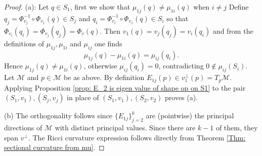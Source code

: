 \documentclass[12pt]{amsart}
\theoremstyle{plain}
\theoremstyle{definition}
\numberwithin{equation}{section}
\begin{document}
\begin{proof}
(a): Let $q\in S_1$, first we show that $\mu_{1j}(q)\neq \mu_{1i}(q)$ when $i\neq j$ Define $q_j=\Phi_{v_j}^{-1}\circ\Phi_{v_1}(q)\in S_{j}$ and $q_i=\Phi_{v_i}^{-1}\circ\Phi_{v_1}(q)\in S_i$ so that $\Phi_{v_i}(q_i)=\Phi_{v_j}(q_j)=\Phi_{v}(q)$. Then $v_1(q)=v_j(q_j)=v_i(q_i)$ and from the definitions of $\mu_{1j},\mu_{1i}$ and $\mu_{ij}$ one finds
\[
\mu_{1j}(q)-\mu_{1i}(q)=\mu_{ij}(q_i).
\]
Hence $\mu_{1j}(q)\neq\mu_{1i}(q)$, otherwise $\mu_{ij}(q_i)=0$, contradicting $0\notin\mu_{ij}(S_i)$. Let $\mathcal{M}$ and $p\in \mathcal{M}$ be as above. By definition $E_{1j}(p)\in v_1^\perp(p)=T_p\mathcal{M}$. Applying Proposition \ref{prop: E_2 is eigen value of shape op on S1} to the pair $(S_1,v_1),(S_j,v_j)$ in place of  $(S_1,v_1),(S_2,v_2)$ proves (a).\\ \hfill

(b) The orthogonality follows since $\{E_{1j}\}_{j=2}^k$ are (pointwise) the principal directions of $\mathcal{M}$ with distinct principal values. Since there are $k-1$ of them, they span $v^\perp$. The Ricci curvature expression follows directly from Theorem \ref{Thm: sectional curvature from mu}.
\end{proof}
\end{document}
